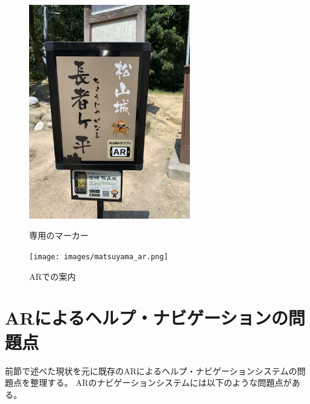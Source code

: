 \begin{figure}[h]
  \begin{minipage}{0.5\hsize}
    \centering
    \includegraphics[width=70mm]{images/matsuyama_marker.jpg}
    \caption{専用のマーカー} \label{fig:matsuyama_marker}
  \end{minipage}
  \begin{minipage}{0.5\hsize}
    \centering
    \texttt{[image: images/matsuyama\_ar.png]}
    \caption{ARでの案内} \label{fig:matsuyama_ar}
  \end{minipage}
\end{figure}



\section{ARによるヘルプ・ナビゲーションの問題点}
\label{problems}
前節で述べた現状を元に既存のARによるヘルプ・ナビゲーションシステムの問題点を整理する。
ARのナビゲーションシステムには以下のような問題点がある。

